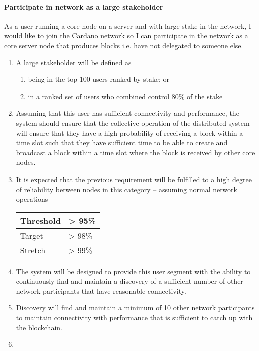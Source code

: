 \documentclass[11pt,a4paper]{article}
\begin{document}
\paragraph{Participate in network as a large stakeholder}
\label{participate-in-network-as-a-large-stakeholder}

As a user running a core node on a server and with large stake in the
network, I would like to join the Cardano network so I can participate
in the network as a core server node that produces blocks i.e. have not
delegated to someone else.

\begin{enumerate}
\item
  A large stakeholder will be defined as

  \begin{enumerate}
  \item
    being in the top 100 users ranked by stake; or
  \item
    in a ranked set of users who combined control 80\% of the stake
  \end{enumerate}
\item
  Assuming that this user has sufficient connectivity and performance,
  the system should ensure that the collective operation of the
  distributed system will ensure that they have a high probability of
  receiving a block within a time slot such that they have sufficient
  time to be able to create and broadcast a block within a time slot
  where the block is received by other core nodes.
\item
  It is expected that the previous requirement will be fulfilled to a
  high degree of reliability between nodes in this category -- assuming
  normal network operations
  \begin{longtable}[]{@{}ll@{}}
  \toprule
  Threshold & \textgreater{} 95\%\tabularnewline
  \endhead
  Target & \textgreater{} 98\%\tabularnewline
  Stretch & \textgreater{} 99\%\tabularnewline
  \bottomrule
  \end{longtable}
\item
  The system will be designed to provide this user segment with the
  ability to continuously find and maintain a discovery of a sufficient
  number of other network participants that have reasonable
  connectivity.
\item
  Discovery will find and maintain a minimum of 10 other network
  participants to maintain connectivity with performance that is
  sufficient to catch up with the blockchain.
\item

\end{enumerate}
\end{document}
